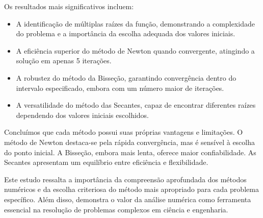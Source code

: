 \documentclass{article}
\begin{document}
Os resultados mais significativos incluem:

\begin{itemize}
    \item A identificação de múltiplas raízes da função, demonstrando a complexidade do problema e a importância da escolha adequada dos valores iniciais.
    \item A eficiência superior do método de Newton quando convergente, atingindo a solução em apenas 5 iterações.
    \item A robustez do método da Bisseção, garantindo convergência dentro do intervalo especificado, embora com um número maior de iterações.
    \item A versatilidade do método das Secantes, capaz de encontrar diferentes raízes dependendo dos valores iniciais escolhidos.
\end{itemize}

Concluímos que cada método possui suas próprias vantagens e limitações. O método de Newton destaca-se pela rápida convergência, mas é sensível à escolha do ponto inicial. A Bisseção, embora mais lenta, oferece maior confiabilidade. As Secantes apresentam um equilíbrio entre eficiência e flexibilidade.

Este estudo ressalta a importância da compreensão aprofundada dos métodos numéricos e da escolha criteriosa do método mais apropriado para cada problema específico. Além disso, demonstra o valor da análise numérica como ferramenta essencial na resolução de problemas complexos em ciência e engenharia.
\\ \\
\printbibliography
\end{document}
